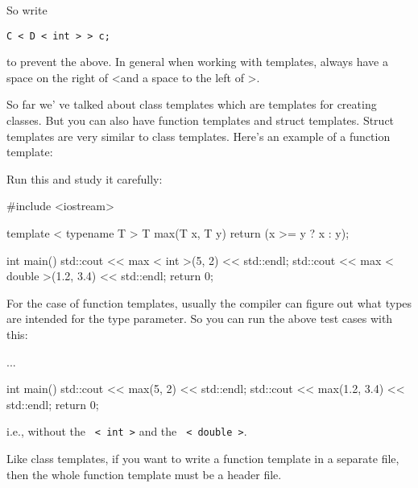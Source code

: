 So write
\begin{center}
\texttt{C < D < int > > c;}
\end{center}
to prevent the above. In general when working with templates, always have a space on the right of \textless and a space to the left of \textgreater.

\newpage{}

So far we' ve talked about class templates which are templates for creating classes. But you can also have function templates and struct templates. Struct templates are very similar to class templates. Here's an example of a function template:

Run this and study it carefully:

\begin{console}
#include <iostream>

template  < typename T >
T max(T x, T y)
{    
     return (x >= y ? x : y);
}

int main()
{    
     std::cout << max < int >(5, 2) << std::endl;
     std::cout << max < double >(1.2, 3.4) << std::endl;
     return 0;
} 
\end{console}

For the case of function templates, usually the compiler can figure out
what types are intended for the type parameter. So you can run the above
test cases with this:

\begin{console}
...

int main()
{    
     std::cout << max(5, 2) << std::endl;
     std::cout << max(1.2, 3.4) << std::endl;
     return 0;
}
\end{console}

i.e., without the \texttt{ < int >} and the \texttt{ < double >}.

Like class templates, if you want to write a function template in a
separate file, then the whole function template must be a header file.

